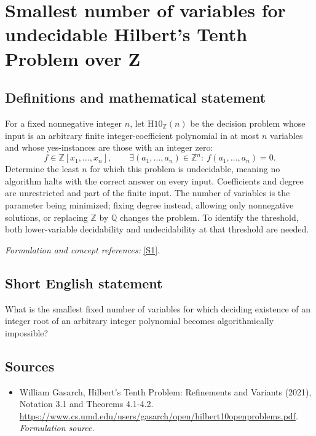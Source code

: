 \documentclass[11pt]{article}
\begin{document}
\section*{\texorpdfstring{Smallest number of variables for undecidable Hilbert's Tenth Problem over Z}{Smallest number of variables for undecidable Hilbert's Tenth Problem over Z}}\label{416}
\subsection{Definitions and mathematical statement}
For a fixed nonnegative integer $n$, let $\mathrm{H10}_{{\mathbb{Z}}}(n)$ be the decision problem whose input is an arbitrary finite integer-coefficient polynomial in at most $n$ variables and whose yes-instances are those with an integer zero:
\[
 f\in{\mathbb{Z}}[x_1,\ldots,x_n],\qquad
 \exists (a_1,\ldots,a_n)\in{\mathbb{Z}}^n:\ f(a_1,\ldots,a_n)=0.
\]
Determine the least $n$ for which this problem is undecidable, meaning no algorithm halts with the correct answer on every input. Coefficients and degree are unrestricted and part of the finite input. The number of variables is the parameter being minimized; fixing degree instead, allowing only nonnegative solutions, or replacing ${\mathbb{Z}}$ by ${\mathbb{Q}}$ changes the problem. To identify the threshold, both lower-variable decidability and undecidability at that threshold are needed.
\par\smallskip\textit{Formulation and concept references:} \href{https://www.cs.umd.edu/users/gasarch/open/hilbert10openproblems.pdf}{[S1]}.

\subsection{Short English statement}
What is the smallest fixed number of variables for which deciding existence of an integer root of an arbitrary integer polynomial becomes algorithmically impossible?
\subsection{Sources}
\begin{itemize}
\item[S1]William Gasarch, Hilbert's Tenth Problem: Refinements and Variants (2021), Notation 3.1 and Theorems 4.1-4.2.
\url{https://www.cs.umd.edu/users/gasarch/open/hilbert10openproblems.pdf}.
\textit{Formulation source.}
\end{itemize}
\end{document}
